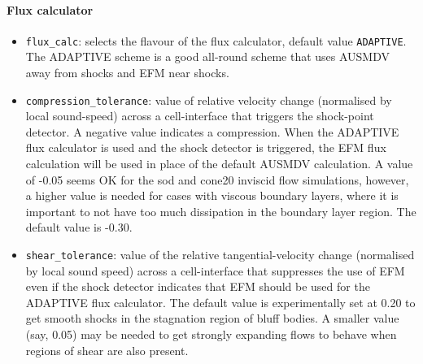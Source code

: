 \documentclass[12pt,a4paper,twoside]{article}
\begin{document}
\paragraph{Flux calculator}
\begin{itemize}
\item \texttt{flux\_calc}: selects the flavour of the flux calculator, 
  default value \texttt{ADAPTIVE}.
  The ADAPTIVE scheme is a good all-round scheme that uses AUSMDV away from
  shocks and EFM near shocks.
\item \texttt{compression\_tolerance}: value of relative velocity change (normalised by local sound-speed)
   across a cell-interface that triggers the shock-point detector.  A negative value indicates a compression.
   When the ADAPTIVE flux calculator is used and the shock detector is triggered, the EFM flux calculation
   will be used in place of the default AUSMDV calculation.
   A value of -0.05 seems OK for the sod and cone20 inviscid flow simulations, however,
   a higher value is needed for cases with viscous boundary layers, 
   where it is important to not have too much dissipation in the boundary layer region.
   The default value is -0.30.
\item \texttt{shear\_tolerance}: value of the relative tangential-velocity change 
   (normalised by local sound speed) across a cell-interface that suppresses the use of EFM even if the
   shock detector indicates that EFM should be used for the ADAPTIVE flux calculator.
   The default value is experimentally set at 0.20 to get smooth shocks
   in the stagnation region of bluff bodies.
   A smaller value (say, 0.05) may be needed to get strongly expanding flows to behave 
   when regions of shear are also present.
\end{itemize}
\end{document}
